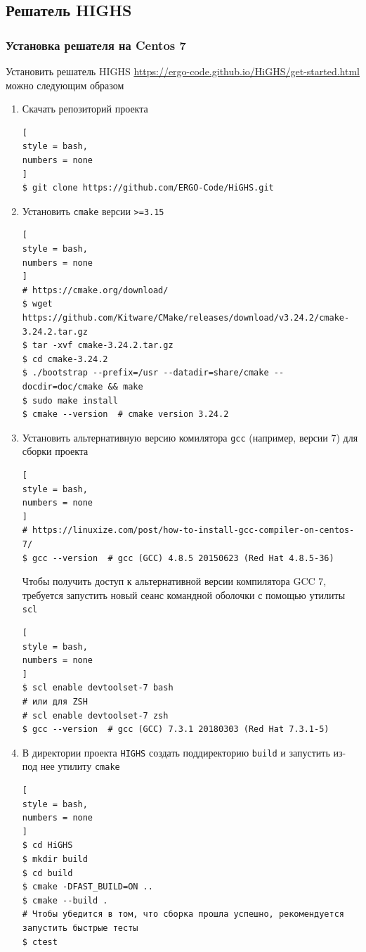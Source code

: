 \documentclass[%
	11pt,
	a4paper,
	utf8,
		]{article}
\begin{document}
\subsection{Решатель HIGHS}

\subsubsection{Установка решателя на Centos 7}

Установить решатель HIGHS \url{https://ergo-code.github.io/HiGHS/get-started.html} можно следующим образом
\begin{enumerate}
	\item Скачать репозиторий проекта
\begin{lstlisting}[
style = bash,
numbers = none
]
$ git clone https://github.com/ERGO-Code/HiGHS.git
\end{lstlisting}
    \item Установить \texttt{cmake} версии \texttt{>=3.15}
\begin{lstlisting}[
style = bash,
numbers = none
]
# https://cmake.org/download/
$ wget https://github.com/Kitware/CMake/releases/download/v3.24.2/cmake-3.24.2.tar.gz
$ tar -xvf cmake-3.24.2.tar.gz
$ cd cmake-3.24.2
$ ./bootstrap --prefix=/usr --datadir=share/cmake --docdir=doc/cmake && make
$ sudo make install
$ cmake --version  # cmake version 3.24.2
\end{lstlisting}
    \item Установить альтернативную версию комилятора \texttt{gcc} (например, версии 7) для сборки проекта
\begin{lstlisting}[
style = bash,
numbers = none	
]
# https://linuxize.com/post/how-to-install-gcc-compiler-on-centos-7/
$ gcc --version  # gcc (GCC) 4.8.5 20150623 (Red Hat 4.8.5-36)
\end{lstlisting}

Чтобы получить доступ к альтернативной версии компилятора GCC 7, требуется запустить новый сеанс командной оболочки с помощью утилиты \texttt{scl}
\begin{lstlisting}[
style = bash,
numbers = none
]
$ scl enable devtoolset-7 bash
# или для ZSH
# scl enable devtoolset-7 zsh
$ gcc --version  # gcc (GCC) 7.3.1 20180303 (Red Hat 7.3.1-5)
\end{lstlisting}

    \item В директории проекта \texttt{HIGHS} создать поддиректорию \texttt{build} и запустить из-под нее утилиту \texttt{cmake}
\begin{lstlisting}[
style = bash,
numbers = none
]
$ cd HiGHS
$ mkdir build
$ cd build
$ cmake -DFAST_BUILD=ON ..
$ cmake --build .
# Чтобы убедится в том, что сборка прошла успешно, рекомендуется запустить быстрые тесты
$ ctest
\end{lstlisting}


\end{enumerate}
\end{document}
